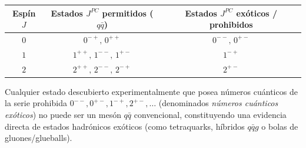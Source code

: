 \begin{problema}
\begin{center}
    \begin{tabular}{c c c}
        \toprule
        \textbf{Espín $J$} & \textbf{Estados $J^{PC}$ permitidos ($q\bar{q}$)} & \textbf{Estados $J^{PC}$ exóticos / prohibidos} \\
        \midrule
        $0$ & $0^{-+}, \, 0^{++}$ & $0^{--}, \, 0^{+-}$ \\
        $1$ & $1^{++}, \, 1^{--}, \, 1^{+-}$ & $1^{-+}$ \\
        $2$ & $2^{++}, \, 2^{--}, \, 2^{-+}$ & $2^{+-}$ \\
        \bottomrule
    \end{tabular}
    \label{tab:estados_jpc_40}
\end{center}

Cualquier estado descubierto experimentalmente que posea números cuánticos de la serie prohibida $0^{--}, 0^{+-}, 1^{-+}, 2^{+-}, \dots$ (denominados \textit{números cuánticos exóticos}) no puede ser un mesón $q\bar{q}$ convencional, constituyendo una evidencia directa de estados hadrónicos exóticos (como tetraquarks, híbridos $q\bar{q}g$ o bolas de gluones/glueballs).
\end{problema}

\newpage
